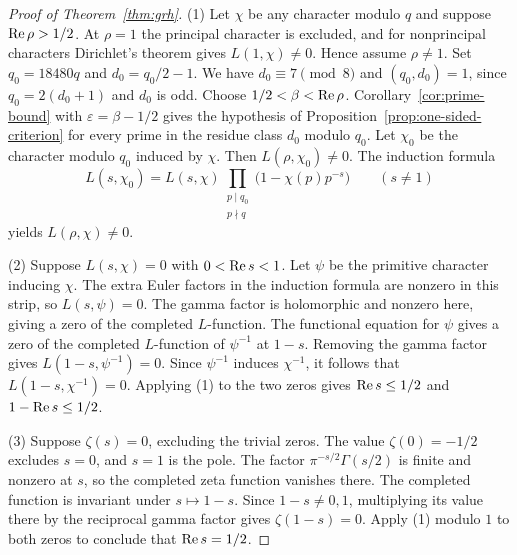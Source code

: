 \begin{proof}[Proof of Theorem~\ref{thm:grh}]
\textup{(1)}
Let \(\chi\) be any character modulo \(q\) and suppose
\(\operatorname{Re}\rho>1/2\). At \(\rho=1\) the principal character is excluded,
and for nonprincipal characters Dirichlet's theorem gives
\(L(1,\chi)\ne0\). Hence assume \(\rho\ne1\).
Set \(q_0=18480q\) and \(d_0=q_0/2-1\).
We have \(d_0\equiv7\pmod8\) and \((q_0,d_0)=1\), since
\(q_0=2(d_0+1)\) and \(d_0\) is odd.
Choose \(1/2<\beta<\operatorname{Re}\rho\).
Corollary~\ref{cor:prime-bound} with \(\varepsilon=\beta-1/2\)
gives the hypothesis of Proposition~\ref{prop:one-sided-criterion}
for every prime in the residue class \(d_0\) modulo \(q_0\).
Let \(\chi_0\) be the character modulo \(q_0\) induced by \(\chi\).
Then \(L(\rho,\chi_0)\ne0\). The induction formula
\[
 L(s,\chi_0)=L(s,\chi)
  \prod_{\substack{p\mid q_0\\p\nmid q}}\bigl(1-\chi(p)p^{-s}\bigr)
 \qquad(s\ne1)
\]
yields \(L(\rho,\chi)\ne0\).

\textup{(2)}
Suppose \(L(s,\chi)=0\) with \(0<\operatorname{Re} s<1\).
Let \(\psi\) be the primitive character inducing \(\chi\).
The extra Euler factors in the induction formula are nonzero
in this strip, so \(L(s,\psi)=0\).
The gamma factor is holomorphic and nonzero here, giving a zero
of the completed \(L\)-function.
The functional equation for \(\psi\) gives a zero of the completed
\(L\)-function of \(\psi^{-1}\) at \(1-s\).
Removing the gamma factor gives \(L(1-s,\psi^{-1})=0\).
Since \(\psi^{-1}\) induces \(\chi^{-1}\), it follows that
\(L(1-s,\chi^{-1})=0\).
Applying (1) to the two zeros gives
\(\operatorname{Re} s\le1/2\) and \(1-\operatorname{Re} s\le1/2\).

\textup{(3)}
Suppose \(\zeta(s)=0\), excluding the trivial zeros.
The value \(\zeta(0)=-1/2\) excludes \(s=0\), and \(s=1\) is the pole.
The factor \(\pi^{-s/2}\Gamma(s/2)\) is finite and nonzero at \(s\),
so the completed zeta function vanishes there. The completed function
is invariant under \(s\mapsto1-s\). Since \(1-s\ne0,1\), multiplying
its value there by the reciprocal gamma factor gives
\(\zeta(1-s)=0\).
Apply (1) modulo \(1\) to both zeros to conclude that
\(\operatorname{Re} s=1/2\).
\end{proof}
